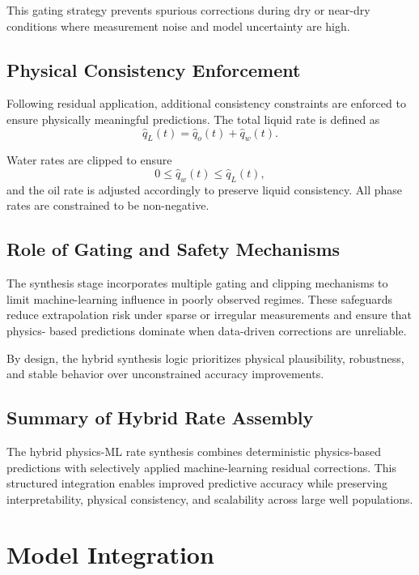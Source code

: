 \documentclass[12pt,APA]{uomthesis}
\begin{document}
This gating strategy prevents spurious corrections during dry or near-dry conditions
where measurement noise and model uncertainty are high.

\subsection{Physical Consistency Enforcement}
Following residual application, additional consistency constraints are enforced to
ensure physically meaningful predictions. The total liquid rate is defined as
\begin{equation}
\hat{q}_L(t) = \hat{q}_o(t) + \hat{q}_w(t).
\end{equation}

Water rates are clipped to ensure
\begin{equation}
0 \le \hat{q}_w(t) \le \hat{q}_L(t),
\end{equation}
and the oil rate is adjusted accordingly to preserve liquid consistency. All phase
rates are constrained to be non-negative.

\subsection{Role of Gating and Safety Mechanisms}
The synthesis stage incorporates multiple gating and clipping mechanisms to limit
machine-learning influence in poorly observed regimes. These safeguards reduce
extrapolation risk under sparse or irregular measurements and ensure that physics-
based predictions dominate when data-driven corrections are unreliable.

By design, the hybrid synthesis logic prioritizes physical plausibility, robustness,
and stable behavior over unconstrained accuracy improvements.

\subsection{Summary of Hybrid Rate Assembly}
The hybrid physics-ML rate synthesis combines deterministic physics-based predictions
with selectively applied machine-learning residual corrections. This structured
integration enables improved predictive accuracy while preserving interpretability,
physical consistency, and scalability across large well populations.

\section{Model Integration}
\label{sec:model_integration}
\end{document}
